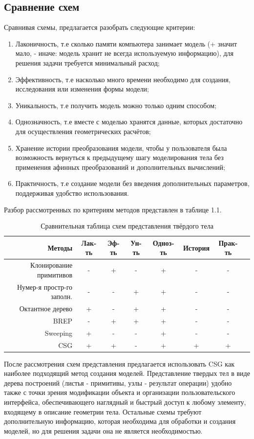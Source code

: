 \subsection{Сравнение схем}
Сравнивая схемы, предлагается разобрать следующие критерии:
\begin{enumerate}
  \item Лаконичность, т.е сколько памяти компьютера занимает модель (+ значит мало, - иначе: модель хранит не всегда используемую информацию), для решения задачи требуется минимальный расход;
  \item Эффективность, т.е насколько много времени необходимо для создания, исследования или изменения формы модели;
  \item Уникальность, т.е получить модель можно только одним способом;
  \item Однозначность, т.е вместе с моделью хранятся данные, которых достаточно для осуществления геометрических расчётов;
  \item Хранение истории преобразования модели, чтобы у пользователя была возможность вернуться к предыдущему шагу моделирования тела без применения афинных преобразований и дополнительных вычислений;
  \item Практичность, т.е создание модели без введения дополнительных параметров, поддерживая удобство использования.
\end{enumerate}
Разбор рассмотренных по критериям методов представлен в таблице 1.1.
\begin{table}[ht]
  \small
  \caption{Сравнительная таблица схем представления твёрдого тела}
  \begin{tabular}{|r|c|c|c|c|c|c|l|}
  \hline
  Методы&Лак-ть&Эф-ть&Ун-ть&Одноз-ть&История&Прак-ть\\
  \hline
  Клонирование примитивов  &-&+&-&+&-&-\\
  Нумер-я простр-го заполн. &-&-&+&+&-&-\\
  Октантное дерево & +& -& + & + & - & -\\
  BREP & -  & + & + & + & - & -\\
  Sweeping  & +  & - & - & + & -& -\\
  CSG  & + & + & - & + & + & + \\
  \hline
  \end{tabular}
  \label{tab:schemes}
\end{table}

После рассмотрения схем представления предлагается использовать CSG как наиболее подходящий метод создания моделей.
Представление  твердых  тел  в  виде  дерева  построений (листья - примитивы, узлы - результат операции) удобно также с точки зрения 
модификации объекта и организации пользовательского интерфейса, обеспечивающего наглядный и быстрый доступ к любому  элементу,
входящему  в  описание  геометрии тела. Остальные схемы требуют дополнительную информацию, которая необходима для обработки и создания моделей, 
но для решения задачи она не является необходимостью.


